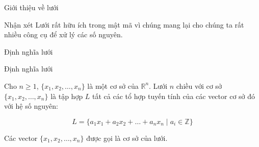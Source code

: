 \documentclass{beamer}
\numberwithin{equation}{section}
\begin{document}
\begin{frame}{Giới thiệu về lưới}
\begin{figure}[!h]
\end{figure}

\begin{block}{Nhận xét}
Lưới rất hữu ích trong mật mã vì chúng mang lại cho chúng ta rất nhiều công cụ để xử lý các số nguyên.
\end{block}

\end{frame}
\begin{frame}{Định nghĩa lưới}

\begin{block}{Định nghĩa lưới}

Cho \(n \geq 1 \), \(\{x_1, x_2, \ldots, x_n\}\) là một cơ sở của \(\mathbb{R}^n\).
Lưới \(n \) chiều với cơ sở \(\{x_1, x_2, \ldots, x_n\}\)
là tập hợp \(L \) tất cả các tổ hợp tuyến tính của các vector cơ sở đó với hệ số nguyên:

$$
L = \{a_1 x_1 + a_2 x_2 + \ldots + a_n x_n \mid a_i \in \mathbb{Z} \}
$$

Các vector \(\{x_1, x_2, \ldots, x_n\}\) được gọi là cơ sở của lưới.

\end{block}

\end{frame}
\end{document}
